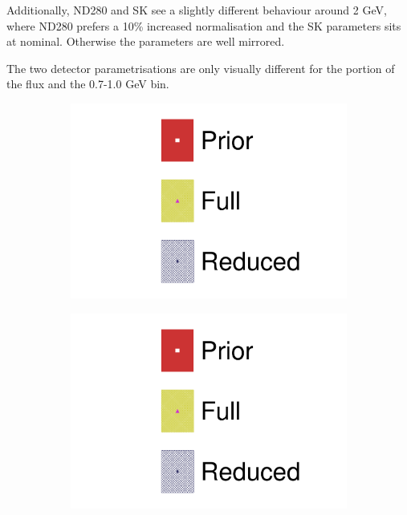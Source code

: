 Additionally, ND280 and SK see a slightly different behaviour around 2 GeV, where ND280 prefers a 10\% increased normalisation and the SK parameters sits at nominal. Otherwise the parameters are well mirrored.

The two detector parametrisations are only visually different for the \nuebar portion of the flux and the 0.7-1.0 GeV \numubar bin.
\begin{figure}[h]
	\centering
	\begin{subfigure}[t]{0.1\textwidth}
		\includegraphics[width=\textwidth,page=1, trim={0mm 130mm 40mm 0mm}, clip]{figures/mach3/2018/data/2018a_FixedCov_FullCov_Mpi_Data_merg_2018a_FixedCov_RedCov_Mpi_Data_merge}
	\end{subfigure}
	\begin{subfigure}[t]{0.1\textwidth}
		\includegraphics[width=\textwidth,page=1, trim={0mm 65mm 40mm 70mm}, clip]{figures/mach3/2018/data/2018a_FixedCov_FullCov_Mpi_Data_merg_2018a_FixedCov_RedCov_Mpi_Data_merge}

\end{subfigure}
\end{figure}
